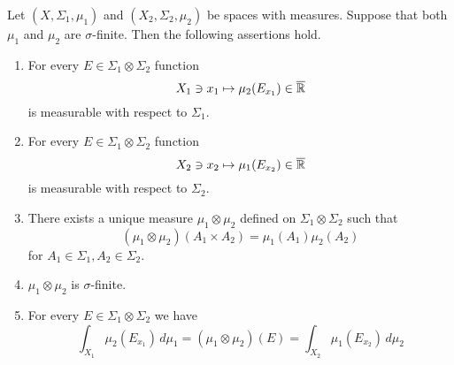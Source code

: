 \begin{theorem}\label{theorem:existence_of_product_measure}
    Let $(X,\Sigma_1,\mu_1)$ and $(X_2,\Sigma_2,\mu_2)$ be spaces with measures. Suppose that both $\mu_1$ and $\mu_2$ are $\sigma$-finite. Then the following assertions hold.
    \begin{enumerate}[label=\emph{\textbf{(\arabic*)}}, leftmargin=*]
        \item For every $E\in \Sigma_1\otimes \Sigma_2$ function
              $$X_1\ni x_1\mapsto \mu_2(E_{x_1})\in \overline{{\mathbb R}}$$
              is measurable with respect to $\Sigma_1$.
        \item For every $E\in \Sigma_1\otimes \Sigma_2$ function
              $$X_2\ni x_2\mapsto \mu_1(E_{x_2})\in \overline{{\mathbb R}}$$
              is measurable with respect to $\Sigma_2$.
        \item There exists a unique measure $\mu_1\otimes \mu_2$ defined on $\Sigma_1\otimes \Sigma_2$ such that
              $$\left(\mu_1\otimes \mu_2\right)\left(A_1\times A_2\right) = \mu_1(A_1)\mu_2(A_2)$$
              for $A_1\in \Sigma_1, A_2\in \Sigma_2$.
        \item $\mu_1\otimes \mu_2$ is $\sigma$-finite.
        \item For every $E\in \Sigma_1\otimes \Sigma_2$ we have
              $$\int_{X_1}\mu_2(E_{x_1})\,d\mu_1 = \left(\mu_1\otimes \mu_2\right)(E) = \int_{X_2}\mu_1(E_{x_2})\,d\mu_2$$
    \end{enumerate}
\end{theorem}
